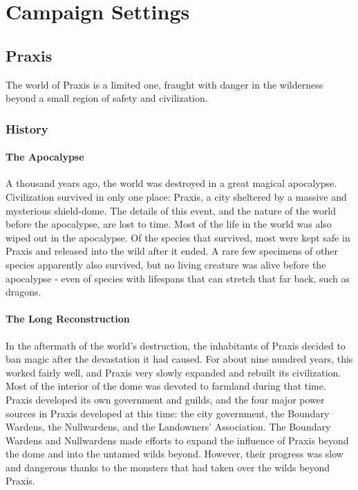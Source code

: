 \chapter{Campaign Settings}\label{Campaign Settings}

\section{Praxis}
  The world of Praxis is a limited one, fraught with danger in the wilderness beyond a small region of safety and civilization.

  \subsection{History}

    \subsubsection{The Apocalypse}
      A thousand years ago, the world was destroyed in a great magical apocalypse.
      Civilization survived in only one place: Praxis, a city sheltered by a massive and mysterious shield-dome.
      The details of this event, and the nature of the world before the apocalypse, are lost to time.
      Most of the life in the world was also wiped out in the apocalypse.
      Of the species that survived, most were kept safe in Praxis and released into the wild after it ended.
      A rare few specimens of other species apparently also survived, but no living creature was alive before the apocalypse - even of species with lifespans that can stretch that far back, such as dragons.

    \subsubsection{The Long Reconstruction}
      In the aftermath of the world's destruction, the inhabitants of Praxis decided to ban magic after the devastation it had caused.
      For about nine nundred years, this worked fairly well, and Praxis very slowly expanded and rebuilt its civilization.
      Most of the interior of the dome was devoted to farmland during that time.
      Praxis developed its own government and guilds, and the four major power sources in Praxis developed at this time: the city government, the Boundary Wardens, the Nullwardens, and the Landowners' Association.
      The Boundary Wardens and Nullwardens made efforts to expand the influence of Praxis beyond the dome and into the untamed wilds beyond.
      However, their progress was slow and dangerous thanks to the monsters that had taken over the wilds beyond Praxis.

